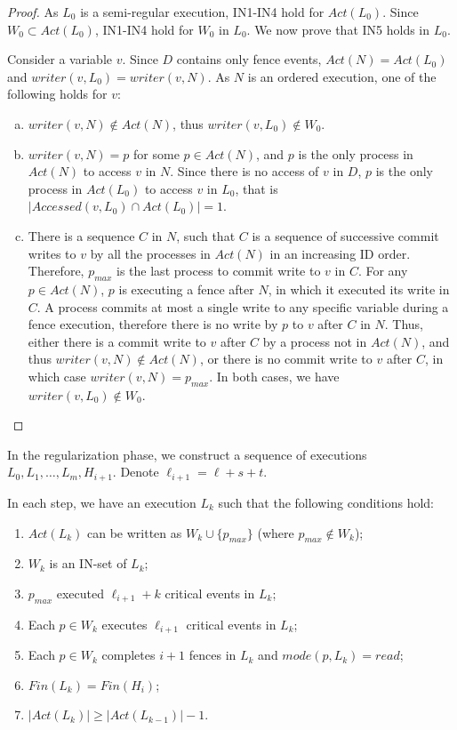 \begin{proof}
	As $L_0$ is a semi-regular execution, IN1-IN4 hold for $Act(L_0)$. Since $W_0 \subset Act(L_0)$, IN1-IN4 hold for $W_0$ in $L_0$. We now prove that IN5 holds in $L_0$.
	
	Consider a variable $v$. Since $D$ contains only fence events, $Act(N) = Act(L_0)$ and $writer(v,L_0) = writer(v,N)$. As $N$ is an ordered execution, one of the following holds for $v$:
	\begin{enumerate} [(a)]
		\item $writer(v,N) \notin Act(N)$, thus $writer(v,L_0) \notin W_0$.
		\item $writer(v,N) = p$ for some $p \in Act(N)$, and $p$ is the only process in $Act(N)$ to access $v$ in $N$. Since there is no access of $v$ in $D$, $p$ is the only process in $Act(L_0)$ to access $v$ in $L_0$, that is $|Accessed(v,L_0) \cap Act(L_0)| = 1$.
		\item There is a sequence $C$ in $N$, such that $C$ is a sequence of successive commit writes to $v$ by all the processes in $Act(N)$ in an increasing ID order. Therefore, $p_{max}$ is the last process to commit write to $v$ in $C$. For any $p \in Act(N)$, $p$ is executing a fence after $N$, in which it executed its write in $C$. A process commits at most a single write to any specific variable during a fence execution, therefore there is no write by $p$ to $v$ after $C$ in $N$. Thus, either there is a commit write to $v$ after $C$ by a process not in $Act(N)$, and thus $writer(v,N) \notin Act(N)$, or there is no commit write to $v$ after $C$, in which case $writer(v,N) = p_{max}$. In both cases, we have $writer(v,L_0) \notin W_0$.
	\end{enumerate}
\end{proof}

In the regularization phase, we construct a sequence of executions $L_0,L_1, \ldots, L_m, H_{i+1}$. Denote $\ell_{i+1} = \ell+s+t$.

\begin{lemma} \label{regularization-phase-lemma}
	In each step, we have an execution $L_k$ such that the following conditions hold:
	\begin{enumerate}[(1)]
		\item $Act(L_k)$ can be written as $W_k \cup \{p_{max}\}$ (where $p_{max} \notin W_k$);
		\item $W_k$ is an IN-set of $L_k$;
		\item $p_{max}$ executed $\ell_{i+1}+k$ critical events in $L_k$;
		\item Each $p \in W_k$ executes $\ell_{i+1}$ critical events in $L_k$;
		\item Each $p \in W_k$ completes $i+1$ fences in $L_k$ and $mode(p,L_k) = read$;
		\item $Fin(L_k) = Fin(H_i)$;
		\item $|Act(L_k)| \geq |Act(L_{k-1})|-1$.
	\end{enumerate}
\end{lemma}

